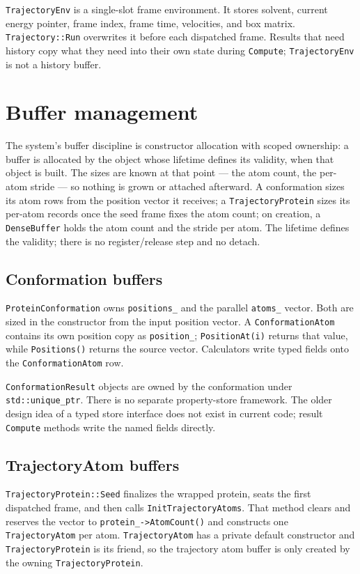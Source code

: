 \documentclass[11pt]{article}
\newcommand{\code}[1]{\texttt{#1}}
\begin{document}
\code{TrajectoryEnv} is a single-slot frame environment. It stores solvent,
current energy pointer, frame index, frame time, velocities, and box matrix.
\code{Trajectory::Run} overwrites it before each dispatched frame. Results
that need history copy what they need into their own state during
\code{Compute}; \code{TrajectoryEnv} is not a history buffer.

\section{Buffer management}

The system's buffer discipline is constructor allocation with scoped ownership: a buffer
is allocated by the object whose lifetime defines its validity, when that object is
built. The sizes are known at that point --- the atom count, the per-atom stride --- so
nothing is grown or attached afterward. A conformation sizes its atom rows from the
position vector it receives; a \code{TrajectoryProtein} sizes its per-atom records once
the seed frame fixes the atom count; on creation, a \code{DenseBuffer} holds the atom
count and the stride per atom. The lifetime defines the validity; there is no
register/release step and no detach.

\subsection{Conformation buffers}

\code{ProteinConformation} owns \code{positions\_} and the parallel
\code{atoms\_} vector. Both are sized in the constructor from the input
position vector. A \code{ConformationAtom} contains its own position copy as
\code{position\_}; \code{PositionAt(i)} returns that value, while
\code{Positions()} returns the source vector. Calculators write typed fields
onto the \code{ConformationAtom} row.

\code{ConformationResult} objects are owned by the conformation under
\code{std::unique\_ptr}. There is no separate property-store framework.
The older design idea of a typed store interface does not exist in current
code; result \code{Compute} methods write the named fields directly.

\subsection{TrajectoryAtom buffers}

\code{TrajectoryProtein::Seed} finalizes the wrapped protein, seats the first
dispatched frame, and then calls \code{InitTrajectoryAtoms}. That method
clears and reserves the vector to \code{protein\_->AtomCount()} and constructs one
\code{TrajectoryAtom} per atom. \code{TrajectoryAtom} has a private default
constructor and \code{TrajectoryProtein} is its friend, so the trajectory atom
buffer is only created by the owning \code{TrajectoryProtein}.
\end{document}

